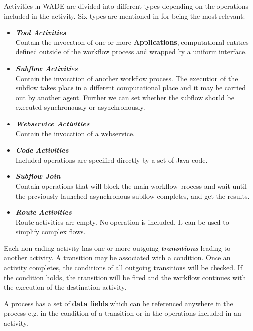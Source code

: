 Activities in WADE are divided into different types depending on the operations included in the activity. Six types are mentioned in \cite{GCWADEUG10} for being the most relevant:
\begin{itemize}
	\item \textbf{\textit{Tool Activities}}\\
	      Contain the invocation of one or more \textbf{Applications}, computational entities defined outside of the workflow process and wrapped by a uniform interface.
	\item \textbf{\textit{Subflow Activities}}\\
	      Contain the invocation of another workflow process. The execution of the subflow takes place in a different computational place and it may be carried out by another agent. Further we can set whether the subflow should be executed synchronously or asynchronously.
	\item \textbf{\textit{Webservice Activities}}\\
				Contain the invocation of a webservice.
	\item \textbf{\textit{Code Activities}}\\
				Included operations are specified directly by a set of Java code. 
	\item \textbf{\textit{Subflow Join}} \\
	      Contain operations that will block the main workflow process and wait until the previously launched asynchronous subflow completes, and get the results.
	\item \textbf{\textit{Route Activities}}\\
				Route activities are empty. No operation is included. It can be used to simplify complex flows. 
\end{itemize}
Each non ending activity has one or more outgoing \textbf{\textit{transitions}} leading to another activity. A transition may be associated with a condition. Once an activity completes, the conditions of all outgoing transitions will be checked. If the condition holds, the transition will be fired and the workflow continues with the execution of the destination activity.

A process has a set of \textbf{data fields} which can be referenced anywhere in the process e.g. in the condition of a transition or in the operations included in an activity. 
\\\\

